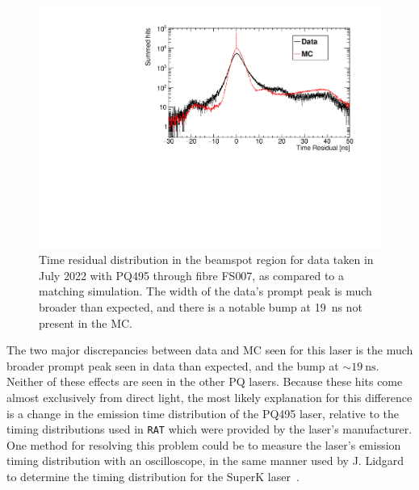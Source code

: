 \begin{figure}
    \centering
    \includegraphics[width=\textwidth]{4_SMELLIESimulation/images/data_vs_mc_FS007_PQ495_nom_scatt_beamspot_tres_plot.pdf}
    \caption[Time residual distribution in the beamspot region for data taken in July 2022 with PQ495 through fibre FS007, as compared to a matching simulation]
    {Time residual distribution in the beamspot region for data taken in July 2022 with PQ495 through fibre FS007, as compared to a matching simulation. The width of the data's prompt peak is much broader than expected, and there is a notable bump at \SI{19}{\ns} not present in the MC.}
    \label{fig:smellie_pq495_prompt_timing_data_vs_mc}
\end{figure}

The two major discrepancies between data and MC seen for this laser is the much broader prompt peak seen in data than expected, and the bump at $\sim\SI{19}{\ns}$. Neither of these effects are seen in the other PQ lasers. Because these hits come almost exclusively from direct light, the most likely explanation for this difference is a change in the emission time distribution of the PQ495 laser, relative to the timing distributions used in \texttt{RAT} which were provided by the laser's manufacturer. One method for resolving this problem could be to measure the laser's emission timing distribution with an oscilloscope, in the same manner used by J. Lidgard to determine the timing distribution for the SuperK laser~\cite{lidgardSupercontinuumAdditionSMELLIE2018}.


